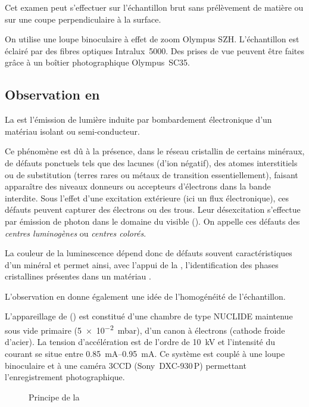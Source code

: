 Cet examen peut s'effectuer sur l'échantillon brut sans prélèvement 
de matière ou sur une coupe perpendiculaire à la surface.

On utilise une loupe binoculaire à effet de zoom Olympus SZH. 
L'échantillon est éclairé par des fibres optiques Intralux~5000. 
Des prises de vue peuvent être faites grâce à un boîtier 
photographique Olympus~SC35.

\subsection{Observation en \CL}
La \CL est l'émission de lumière induite par bombardement électronique 
d'un matériau isolant ou semi-conducteur.

Ce phénomène est dû à la présence, dans le réseau cristallin de 
certains minéraux, de défauts ponctuels tels que des lacunes (d'ion 
négatif), des atomes interstitiels ou de substitution (terres rares 
ou métaux de transition essentiellement), faisant apparaître des 
niveaux donneurs ou accepteurs d'électrons dans la bande interdite. 
Sous l'effet d'une excitation extérieure (ici un flux électronique), 
ces défauts peuvent capturer des électrons ou des trous. Leur 
désexcitation s'effectue par émission de photon dans le domaine 
du visible (). On appelle ces défauts des 
\emph{centres luminogènes} ou \emph{centres colorés}.

La couleur de la luminescence dépend donc de défauts souvent 
caractéristiques d'un minéral et permet ainsi, avec l'appui de 
la \DX, l'identification des phases cristallines présentes dans 
un matériau \autocite{Bechtel_2000}.

L'observation en \CL donne également une idée de l'homogénéité de 
l'échantillon.

L'appareillage de \CL () est constitué d'une chambre 
de type NUCLIDE maintenue sous vide primaire (\SI{5e-2}{\milli\bar}), 
d'un canon à électrons (cathode froide d'acier). La tension 
d'accélération est de l'ordre de \SI{10}{\kV} et l'intensité du 
courant se situe entre \SIrange[range-phrase=\ et\ ]{0.85}{0.95}{\mA}. 
Ce système est couplé à une loupe binoculaire et à une caméra 3CCD 
(Sony~DXC-930\,P) permettant l'enregistrement photographique.

\begin{figure}[htb]
  \caption[Principe de la \CL]
          {Principe de la \CL \autocite[d'après][]{web_CL}}
  \label{fig:CL_principe}
\end{figure}

